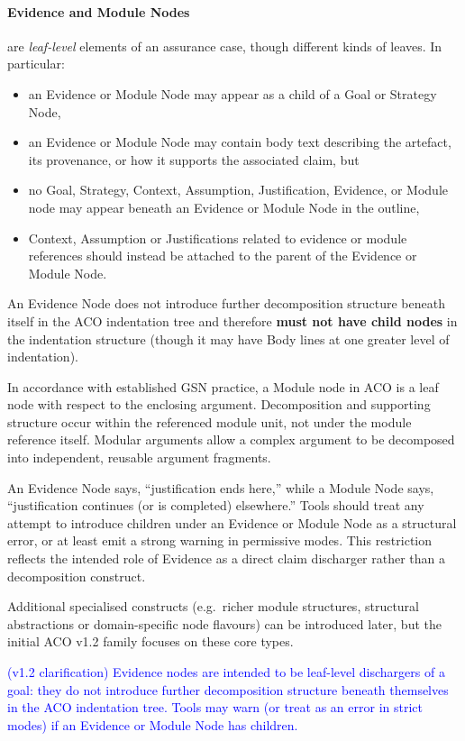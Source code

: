 \documentclass[11pt,twoside,a4paper]{article}
\begin{document}
\paragraph{Evidence and Module Nodes} are \emph{leaf-level} elements of an assurance case, though different kinds of leaves.
In particular:
\begin{itemize}[leftmargin=2em]
  \item an Evidence or Module Node may appear as a child of a Goal or Strategy Node,
  \item an Evidence or Module Node may contain body text describing the artefact, its provenance,
        or how it supports the associated claim, but
  \item no Goal, Strategy, Context, Assumption, Justification, Evidence, or Module node
        may appear beneath an Evidence or Module Node in the outline,
  \item Context, Assumption or Justifications related to evidence or module references should instead be attached to the parent of the Evidence or Module Node.
\end{itemize}

An Evidence Node
does not introduce further decomposition structure beneath itself in the ACO indentation tree and therefore
\textbf{must not have child nodes} in the indentation structure (though it may have Body lines at one greater level of indentation).

In accordance with established GSN practice, a Module node in ACO is a leaf node with respect to the enclosing argument. Decomposition and supporting structure occur within the referenced module unit, not under the module reference itself.
Modular arguments allow a complex argument to be decomposed into independent, reusable argument fragments.

An Evidence Node says, ``justification ends here,'' while a Module Node says, ``justification continues (or is completed) elsewhere.''
Tools should treat any attempt to introduce children under an Evidence or Module Node as a
structural error, or at least emit a strong warning in permissive modes.
This restriction reflects the intended role of Evidence as a direct claim discharger
rather than a decomposition construct.

Additional specialised constructs (e.g.\ richer module structures, structural abstractions or domain-specific node flavours) can be introduced later, but the initial ACO v1.2 family focuses on these core types.

\textcolor{blue}{(v1.2 clarification) Evidence nodes are intended to be leaf-level dischargers of a goal: they do not introduce further decomposition structure beneath themselves in the ACO indentation tree. Tools may warn (or treat as an error in strict modes) if an Evidence or Module Node has children.}
\end{document}

